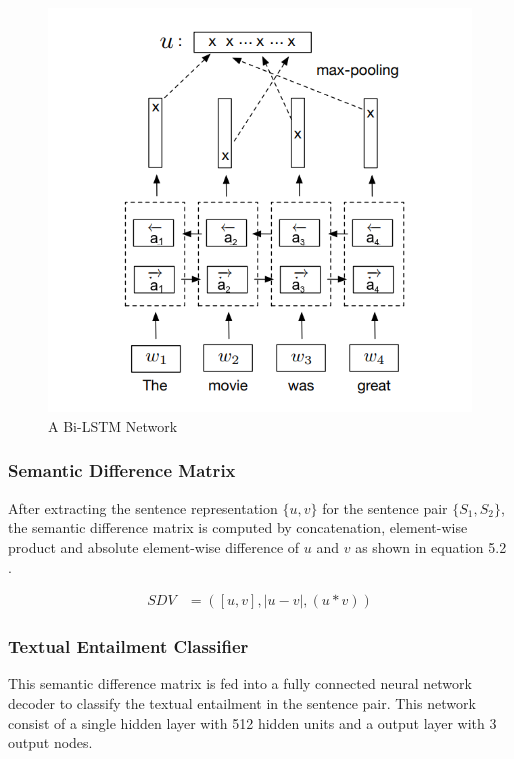 \documentclass[12pt]{report} %
\begin{document}
	\begin{figure}[!tbp]
		\centering
		\includegraphics[scale=0.40]{image/Bi-LSTM.png}
		\caption{A Bi-LSTM Network \citep{conneau2017supervised}}
		\label{bilstm}
	\end{figure}
	
	\subsubsection{Semantic Difference Matrix}
	
	After extracting the sentence representation $\{u,v\}$  for the sentence pair $\{S_{1},S_{2}\}$, the semantic difference matrix is computed by concatenation, element-wise product and absolute element-wise difference of $u$ and $v$ as shown in equation 5.2 .
	
	\begin{align} 
	SDV & =([u,v],|u - v|,(u \ast v)) 
	\end{align}
	
	\subsubsection{Textual Entailment Classifier}
	
	This semantic difference matrix is fed into a fully connected neural network decoder to classify the textual entailment in the sentence pair. This network consist of a single hidden layer with 512 hidden units and a output layer with 3 output nodes. 
	
\end{document}

